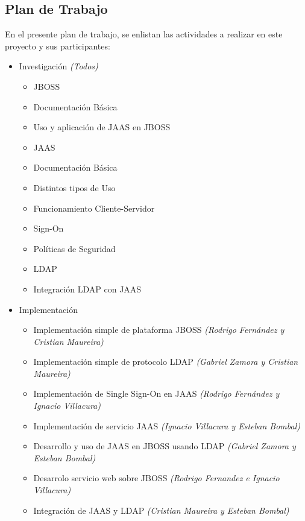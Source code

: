 \subsection{Plan de Trabajo}
En el presente plan de trabajo, se enlistan las actividades a realizar en este proyecto y sus participantes:
\small
\begin{itemize}
\item Investigación \emph{(Todos)}
\begin{itemize}
	\item JBOSS
	\item Documentación Básica
	\item Uso y aplicación de JAAS en JBOSS
	\item JAAS 
	\item Documentación Básica
	\item Distintos tipos de Uso
	\item Funcionamiento Cliente-Servidor
	\item Sign-On
	\item Políticas de Seguridad
	\item LDAP
	\item Integración LDAP con JAAS
\end{itemize}
\item Implementación
\begin{itemize}
	\item Implementación simple de plataforma JBOSS \emph{(Rodrigo Fernández y Cristian Maureira)}
	\item Implementación simple de protocolo LDAP \emph{(Gabriel Zamora y Cristian Maureira)}
	\item Implementación de Single Sign-On en JAAS \emph{(Rodrigo Fernández y Ignacio Villacura)}
	\item Implementación de servicio JAAS \emph{(Ignacio Villacura y Esteban Bombal)}
	\item Desarrollo y uso de JAAS en JBOSS usando LDAP \emph{(Gabriel Zamora y Esteban Bombal)} 
	\item Desarrolo servicio web sobre JBOSS \emph{(Rodrigo Fernandez e Ignacio Villacura)}
	\item Integración de JAAS y LDAP \emph{(Cristian Maureira y Esteban Bombal)}

\end{itemize}
\end{itemize}
